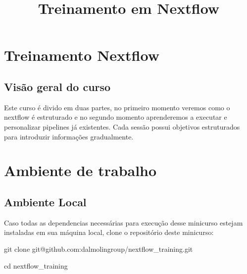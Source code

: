 \documentclass[
  brazilian,
  letterpaper,
  DIV=11,
  numbers=noendperiod]{scrreprt}
\title{Treinamento em Nextflow}
\author{}
\date{}
\newenvironment{Shaded}{\begin{snugshade}}{\end{snugshade}}
\newcommand{\BuiltInTok}[1]{\textcolor[rgb]{0.00,0.23,0.31}{#1}}
\newcommand{\FunctionTok}[1]{\textcolor[rgb]{0.28,0.35,0.67}{#1}}
\newcommand{\NormalTok}[1]{\textcolor[rgb]{0.00,0.23,0.31}{#1}}
\renewcommand*\contentsname{Índice}
\newcommand\contentsname{Índice}
\begin{document}
\maketitle


\renewcommand*\contentsname{Índice}
{
\setcounter{tocdepth}{2}
\tableofcontents
}


\chapter{Treinamento Nextflow}\label{treinamento-nextflow}

\section{Visão geral do curso}\label{visuxe3o-geral-do-curso}

Este curso é divido em duas partes, no primeiro momento veremos como o
nextflow é estruturado e no segundo momento aprenderemos a executar e
personalizar pipelines já existentes. Cada sessão possui objetivos
estruturados para introduzir informações gradualmente.


\chapter{Ambiente de trabalho}\label{ambiente-de-trabalho}

\section{Ambiente Local}\label{ambiente-local}

Caso todas as dependencias necessárias para execução desse minicurso
estejam instaladas em sua máquina local, clone o repositório deste
minicurso:

\begin{Shaded}
\begin{Highlighting}[]
\FunctionTok{git}\NormalTok{ clone git@github.com:dalmolingroup/nextflow\_training.git}

\BuiltInTok{cd}\NormalTok{ nextflow\_training}
\end{Highlighting}
\end{Shaded}
\end{document}
